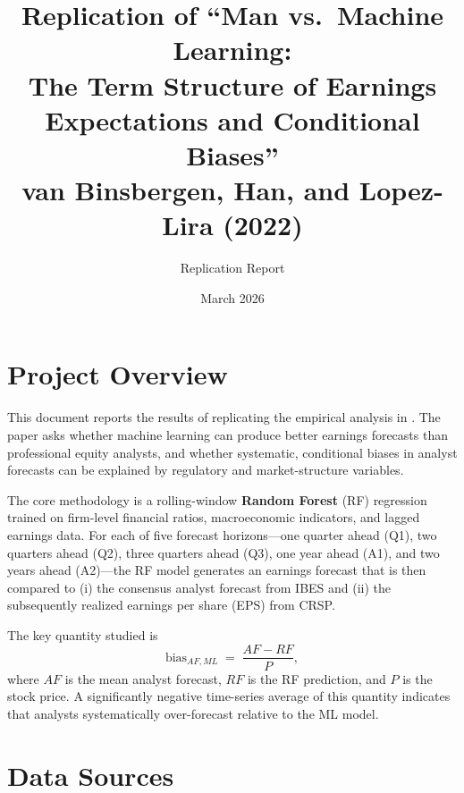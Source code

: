 \documentclass[12pt]{article}
\begin{document}
\title{
  Replication of ``Man vs.\ Machine Learning: \\
  The Term Structure of Earnings Expectations and Conditional Biases'' \\
  {\large \normalfont van Binsbergen, Han, and Lopez-Lira (2022)}
}
\author{Replication Report}
\date{March 2026}
\maketitle
\tableofcontents
\newpage

\doublespacing

\section{Project Overview}

This document reports the results of replicating the empirical analysis in
\citet{vanbinsbergen2022man}.  The paper asks whether machine learning can
produce better earnings forecasts than professional equity analysts, and whether
systematic, conditional biases in analyst forecasts can be explained by
regulatory and market-structure variables.

The core methodology is a rolling-window \textbf{Random Forest} (RF) regression
trained on firm-level financial ratios, macroeconomic indicators, and lagged
earnings data.  For each of five forecast horizons---one quarter ahead (Q1),
two quarters ahead (Q2), three quarters ahead (Q3), one year ahead (A1), and
two years ahead (A2)---the RF model generates an earnings forecast that is then
compared to (i) the consensus analyst forecast from IBES and (ii) the
subsequently realized earnings per share (EPS) from CRSP.

The key quantity studied is
\[
  \text{bias}_{AF,ML} \;=\; \frac{AF - RF}{P},
\]
where $AF$ is the mean analyst forecast, $RF$ is the RF prediction, and $P$ is
the stock price.  A significantly negative time-series average of this quantity
indicates that analysts systematically over-forecast relative to the ML model.

\section{Data Sources}
\end{document}
